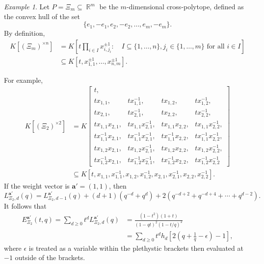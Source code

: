\documentclass[a4paper,12pt]{amsart}
\theoremstyle{plain}
\theoremstyle{definition}
\theoremstyle{remark}
\newtheorem{example}[theorem]{Example}
\DeclareMathOperator{\RR}{\mathbb{R}}
\begin{document}
\begin{example}\label{example:cross-polytope}
Let $P = \Xi_m \subseteq \RR^m$ be the $m$-dimensional cross-polytope, defined as the convex hull of the set
\[
\{e_1, -e_1, e_2, -e_2, \ldots, e_m, -e_m\}.
\]
By definition,
\begin{align*}
    K[(\Xi_m)^{\times n}]
    &= K\left [ t \prod_{i \in I} x_{i, j_i}^{\pm 1}: \quad I \subseteq \{1, \ldots, n\}, j_i \in \{1, \ldots, m\} \text{ for all } i \in I \right ] \\
    &\subseteq K \left [t, x_{1, 1}^{\pm 1}, \ldots, x_{n, m}^{\pm1} \right ].
\end{align*}

For example,
\begin{align*}
    K[(\Xi_2)^{\times 2}] 
    &= K\left [ \begin{matrix}
    t,   &     &     &     \\
    tx_{1, 1}, & tx_{1, 1}^{-1}, & tx_{1, 2}, & tx_{1, 2}^{-1}, \\
    tx_{2, 1}, & tx_{2, 1}^{-1}, & tx_{2, 2}, & tx_{2, 2}^{-1}, \\
    tx_{1, 1}x_{2, 1}, & tx_{1, 1}x_{2, 1}^{-1}, & tx_{1, 1}x_{2, 2}, & tx_{1, 1}x_{2, 2}^{-1}, \\
    tx_{1, 1}^{-1}x_{2, 1}, & tx_{1, 1}^{-1}x_{2, 1}^{-1}, & tx_{1, 1}^{-1}x_{2, 2}, & tx_{1, 1}^{-1}x_{2, 2}^{-1}, \\
    tx_{1, 2}x_{2, 1}, & tx_{1, 2}x_{2, 1}^{-1}, & tx_{1, 2}x_{2, 2}, & tx_{1, 2}x_{2, 2}^{-1}, \\
    tx_{1, 2}^{-1}x_{2, 1}, & tx_{1, 2}^{-1}x_{2, 1}^{-1}, & tx_{1, 2}^{-1}x_{2, 2}, & tx_{1, 2}^{-1}x_{2, 2}^{-1}
    \end{matrix} \right ] \\
    &\subseteq K \left [t, x_{1, 1}, x_{1, 1}^{-1}, x_{1, 2}, x_{1, 2}^{-1}, x_{2, 1}, x_{2, 1}^{-1}, x_{2, 2}, x_{2, 2}^{-1} \right ].
\end{align*}
If the weight vector is $\bm{a}' = (1, 1)$, then
\[
L^{\bm{a}'}_{\Xi_2,d}(q)  = L^{\bm{a}'}_{\Xi_2,d-1}(q) + (d+1)( q^{-d} +q^d) + 2\left( q^{-d+2} +q^{-d+4}  + \cdots + q^{d-2} \right) .
\]
It follows that 
\begin{align*} E^{\bm{a}'}_{\Xi_2}(t,q) = 
\sum_{d \geq 0} t^dL^{\bm{a}'}_{\Xi_2,d}(q) &= \frac{
(1-t^2)(1+t) 
}{
(1-qt)^2 (1-t/q)^2
} \\
& = \sum_{d \geq 0} t^d h_d\left[ 2 \left(q+\frac{1}{q} - \epsilon \right) -1 \right],
\end{align*}
where $\epsilon$ is treated as a variable within the plethystic brackets then evaluated at $-1$ outside of the brackets.

\end{example}
\end{document}
